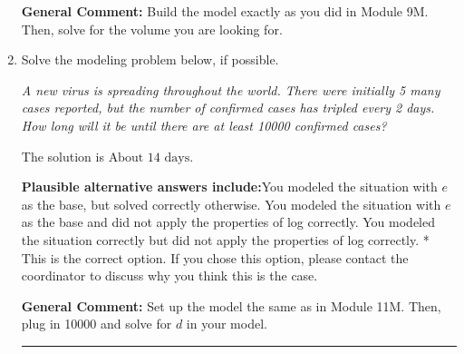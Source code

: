 \documentclass{extbook}[14pt]
\newcommand{\litem}[1]{\item #1

\rule{\textwidth}{0.4pt}}
\begin{document}
\begin{enumerate}
{\textbf{General Comment:} Build the model exactly as you did in Module 9M. Then, solve for the volume you are looking for.
}
\litem{
Solve the modeling problem below, if possible.

\begin{center}
    \textit{ A new virus is spreading throughout the world. There were initially 5 many cases reported, but the number of confirmed cases has tripled every 2 days. How long will it be until there are at least 10000 confirmed cases? }
\end{center}
The solution is \( \text{About } 14 \text{ days} \).\begin{enumerate}[label=\Alph*.]
\textbf{Plausible alternative answers include:}You modeled the situation with $e$ as the base, but solved correctly otherwise.
You modeled the situation with $e$ as the base and did not apply the properties of log correctly.
You modeled the situation correctly but did not apply the properties of log correctly.
* This is the correct option.
If you chose this option, please contact the coordinator to discuss why you think this is the case.
\end{enumerate}

\textbf{General Comment:} Set up the model the same as in Module 11M. Then, plug in 10000 and solve for $d$ in your model.
}
\end{enumerate}
\end{document}
